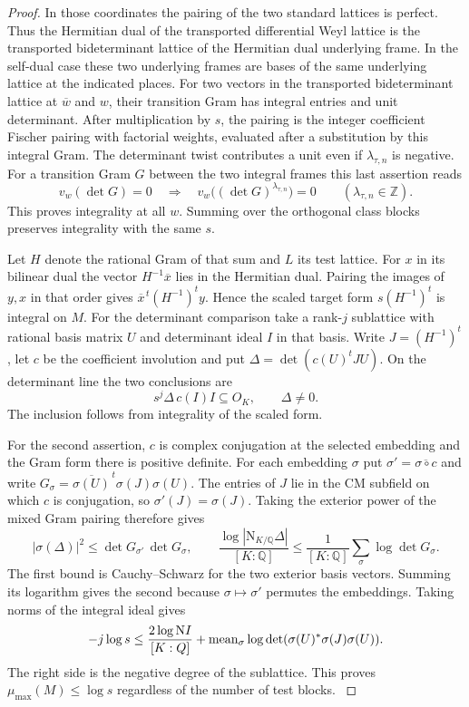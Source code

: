 \begin{proof}
In those coordinates the pairing of the two
standard lattices is perfect. Thus the Hermitian dual of
the transported differential Weyl lattice is the transported
bideterminant lattice of the Hermitian dual
underlying frame. In the self-dual case these two
underlying frames are bases of the same underlying lattice
at the indicated places. For two vectors in the transported
bideterminant lattice at \(\overline w\) and \(w\), their
transition Gram has integral entries and unit determinant.
After multiplication by \(s\), the pairing is the integer
coefficient Fischer pairing with factorial weights,
evaluated after a substitution by this integral Gram.
The determinant twist contributes a unit even if
\(\lambda_{\tau,n}\) is negative.
For a transition Gram \(G\) between the two integral frames this last assertion reads
\[
  v_w(\det G)=0\quad\Longrightarrow\quad v_w\big((\det G)^{\lambda_{\tau,n}}\big)=0\qquad(\lambda_{\tau,n}\in\mathbb Z).
\]
 This proves integrality
at all \(w\). Summing over the orthogonal class blocks
preserves integrality with the same \(s\).
\label{cor:fitted-test-slope-1}

Let \(H\) denote the rational Gram of that sum and \(L\)
its test lattice. For \(x\) in its bilinear dual the vector
\(H^{-1}\overline{x}\) lies in the Hermitian dual.
Pairing the images of \(y,x\) in that order gives
\(\overline{x}^{\,t}(H^{-1})^t y\). Hence the scaled
target form \(s(H^{-1})^t\) is integral on \(M\).
For the determinant comparison take a rank-\(j\)
sublattice with rational basis matrix \(U\) and determinant
ideal \(I\) in that basis. Write \(J=(H^{-1})^t\), let
\(c\) be the coefficient involution and put
\(\Delta=\det(c(U)^tJU)\). On the determinant line the two conclusions are
\[
       s^j\Delta\,c(I)I\subseteq O_K,\qquad \Delta\ne0 .
\]
The inclusion follows from integrality of the scaled form.

For the
second assertion, \(c\) is complex conjugation at the selected
embedding and the Gram form there is positive definite.
For each embedding \(\sigma\) put \(\sigma'=\overline{\sigma\circ c}\)
and write \(G_\sigma=\overline{\sigma(U)}^{\,t}\sigma(J)\sigma(U)\).
The entries of \(J\) lie in the CM subfield on which \(c\) is
conjugation, so \(\sigma'(J)=\sigma(J)\). Taking the exterior
power of the mixed Gram pairing therefore gives
\[
 |\sigma(\Delta)|^2
       \le\det G_{\sigma'}\,\det G_\sigma,\qquad
 \frac{\log|\mathrm N_{K/\mathbb Q}\Delta|}{[K:\mathbb Q]}
       \le \frac{1}{[K:\mathbb Q]}\sum_\sigma\log\det G_\sigma .
\]
The first bound is Cauchy--Schwarz for the two exterior basis
vectors. Summing its logarithm gives the second because
\(\sigma\mapsto\sigma'\) permutes the embeddings.
Taking norms of the integral ideal gives
\[
 -j\log s\le
  \frac{2\log\mathrm N I}{[K:Q]}
  +\operatorname{mean}_{\sigma}\log
                     \det(\sigma(U)^*\sigma(J)\sigma(U)).
\]
The right side is the negative degree of the sublattice.
This proves \(\mu_{\max}(M)\le\log s\) regardless of the
number of test blocks.
\label{cor:fitted-test-slope-2}


\end{proof}
